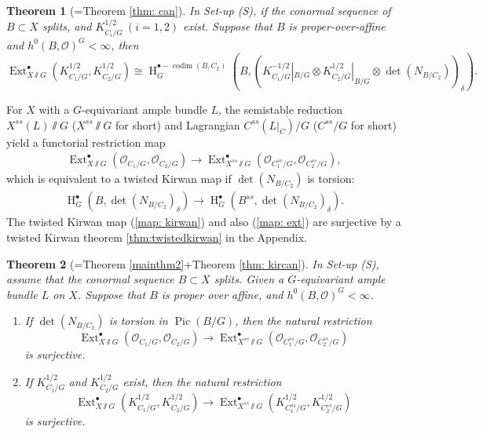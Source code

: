 \documentclass[12pt]{amsart}
\newtheorem{theorem}{Theorem}[section]
\theoremstyle{definition}
\theoremstyle{remark}
\numberwithin{equation}{section}
\newcommand{\shO}{\mathcal{O}}
\newcommand{\codim}{\operatorname{codim}}
\newcommand{\Ext}{\operatorname{Ext}}
\newcommand{\Pic}{\operatorname{Pic}}
\newcommand{\arw}{\longrightarrow}
\newcommand{\Hdot}{\operatorname{H}}
\begin{document}
\begin{theorem}[=Theorem \ref{thm: can}]
    In Set-up (S), if the conormal sequence of $B\subset X$ splits, and $K_{C_i/G }^{1/2}~(i=1,2)$ exist. Suppose that $B$ is proper-over-affine and $h^0(B, \shO)^{G}<\infty$, then
    $$\Ext^{\bullet}_{X\sslash G}(K^{1/2}_{C_1/G}, K^{1/2}_{C_2/G})\cong \Hdot^{\bullet-\codim(B, C_2)}_G(B, (K_{C_1/G}^{-1/2}|_{B/G}\otimes K_{C_2/G}^{1/2}|_{B/G}\otimes \det(N_{B/C_2}))_{\delta}).$$
\end{theorem}

For $X$ with a $G$-equivariant ample bundle $L$, the semistable reduction $X^{ss}(L)\sslash  G$ ($X^{ss}\sslash  G$ for short) and Lagrangian $C^{ss}(L|_C)/G$ ($C^{ss}/G$ for short) yield a functorial restriction map
\begin{align}\label{map: ext}
    \Ext_{X\sslash  G}^{\bullet}(\shO_{C_1/G}, \shO_{C_2/G})\arw \Ext_{X^{ss}\sslash  G}^{\bullet}(\shO_{C_1^{ss}/G}, \shO_{C_2^{ss}/G}),
\end{align}
which is equivalent to a twisted Kirwan map if $\det(N_{B/C_2})$ is torsion:
\begin{align}\label{map: kirwan}
    \Hdot^{\bullet}_G(B, \det(N_{B/C_2})_{\delta})\arw \Hdot^{\bullet}_G(B^{ss}, 
\det(N_{B/C_2})_{\delta}).
\end{align} 
The twisted Kirwan map (\ref{map: kirwan}) and also (\ref{map: ext}) are surjective by a twisted Kirwan theorem  \ref{thm:twistedkirwan} in the Appendix.
\begin{theorem}[=Theorem \ref{mainthm2}+Theorem \ref{thm: kircan}] In Set-up (S), assume that the conormal sequence $B\subset X$ splits. Given a $G$-equivariant ample bundle $L$ on $X$. Suppose that  $B$ is proper over affine, and $h^0(B, \shO)^G<\infty$.
    \begin{enumerate}
        \item If $\det(N_{B/C_2})$ is torsion in $\Pic(B/G)$, then the natural restriction 
    $$\Ext_{X\sslash  G}^{\bullet}(\shO_{C_1/G}, \shO_{C_2/G})\arw \Ext_{X^{ss}\sslash  G}^{\bullet}(\shO_{C_1^{ss}/G}, \shO_{C_2^{ss}/G})$$
    is surjective.
    \item If $K_{C_1/G}^{1/2}$ and $K_{C_2/G}^{1/2}$ exist, then the natural restriction 
    $$\Ext_{X\sslash  G}^{\bullet}(K_{C_1/G}^{1/2}, K_{C_2/G}^{1/2})\arw \Ext_{X^{ss}\sslash  G}^{\bullet}(K_{C^{ss}_1/G}^{1/2}, K_{C^{ss}_2/G}^{1/2})$$
    is surjective.
    \end{enumerate}
\end{theorem}
\end{document}
